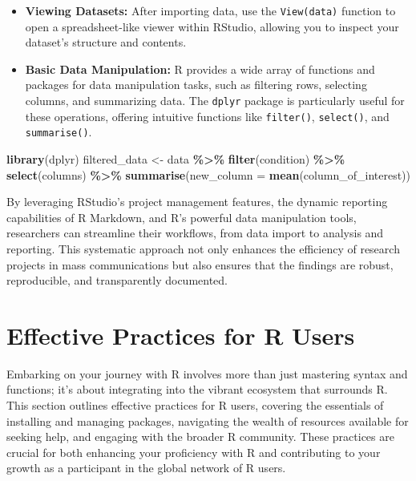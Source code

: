 \documentclass[
]{book}
\newenvironment{Shaded}{\begin{snugshade}}{\end{snugshade}}
\newcommand{\AttributeTok}[1]{\textcolor[rgb]{0.13,0.29,0.53}{#1}}
\newcommand{\FunctionTok}[1]{\textcolor[rgb]{0.13,0.29,0.53}{\textbf{#1}}}
\newcommand{\NormalTok}[1]{#1}
\newcommand{\OtherTok}[1]{\textcolor[rgb]{0.56,0.35,0.01}{#1}}
\newcommand{\SpecialCharTok}[1]{\textcolor[rgb]{0.81,0.36,0.00}{\textbf{#1}}}
\begin{document}
\begin{itemize}
\item
  \textbf{Viewing Datasets:} After importing data, use the \texttt{View(data)} function to open a spreadsheet-like viewer within RStudio, allowing you to inspect your dataset's structure and contents.
\item
  \textbf{Basic Data Manipulation:} R provides a wide array of functions and packages for data manipulation tasks, such as filtering rows, selecting columns, and summarizing data. The \texttt{dplyr} package is particularly useful for these operations, offering intuitive functions like \texttt{filter()}, \texttt{select()}, and \texttt{summarise()}.
\end{itemize}

\begin{Shaded}
\begin{Highlighting}[]
\FunctionTok{library}\NormalTok{(dplyr)}
\NormalTok{filtered\_data }\OtherTok{\textless{}{-}}\NormalTok{ data }\SpecialCharTok{\%\textgreater{}\%}
  \FunctionTok{filter}\NormalTok{(condition) }\SpecialCharTok{\%\textgreater{}\%}
  \FunctionTok{select}\NormalTok{(columns) }\SpecialCharTok{\%\textgreater{}\%}
  \FunctionTok{summarise}\NormalTok{(}\AttributeTok{new\_column =} \FunctionTok{mean}\NormalTok{(column\_of\_interest))}
\end{Highlighting}
\end{Shaded}

By leveraging RStudio's project management features, the dynamic reporting capabilities of R Markdown, and R's powerful data manipulation tools, researchers can streamline their workflows, from data import to analysis and reporting. This systematic approach not only enhances the efficiency of research projects in mass communications but also ensures that the findings are robust, reproducible, and transparently documented.

\section{Effective Practices for R Users}\label{effective-practices-for-r-users}

Embarking on your journey with R involves more than just mastering syntax and functions; it's about integrating into the vibrant ecosystem that surrounds R. This section outlines effective practices for R users, covering the essentials of installing and managing packages, navigating the wealth of resources available for seeking help, and engaging with the broader R community. These practices are crucial for both enhancing your proficiency with R and contributing to your growth as a participant in the global network of R users.
\end{document}
